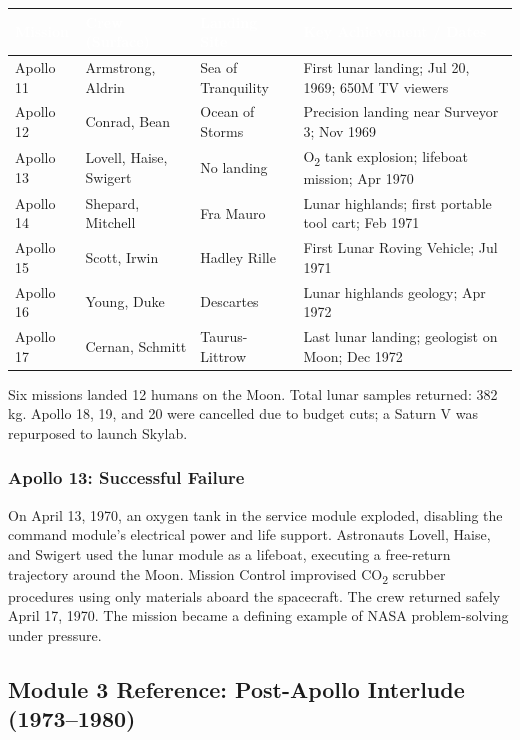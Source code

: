 \documentclass[11pt,letterpaper]{article}
\newcommand{\tableheader}[1]{\textbf{\sffamily\textcolor{white}{#1}}}
\begin{document}
\begin{center}
\begin{tabularx}{\textwidth}{L{1.8cm}L{3.5cm}L{2.2cm}X}
\toprule
{}
\tableheader{Mission} & \tableheader{Crew (Surface)} & \tableheader{Landing Site} & \tableheader{Key Achievement / Dates} \\
\midrule
Apollo 11 & Armstrong, Aldrin & Sea of Tranquility & First lunar landing; Jul 20, 1969; 650M TV viewers \\
Apollo 12 & Conrad, Bean & Ocean of Storms & Precision landing near Surveyor 3; Nov 1969 \\
Apollo 13 & Lovell, Haise, Swigert & No landing & O\textsubscript{2} tank explosion; lifeboat mission; Apr 1970 \\
Apollo 14 & Shepard, Mitchell & Fra Mauro & Lunar highlands; first portable tool cart; Feb 1971 \\
Apollo 15 & Scott, Irwin & Hadley Rille & First Lunar Roving Vehicle; Jul 1971 \\
Apollo 16 & Young, Duke & Descartes & Lunar highlands geology; Apr 1972 \\
Apollo 17 & Cernan, Schmitt & Taurus-Littrow & Last lunar landing; geologist on Moon; Dec 1972 \\
\bottomrule
\end{tabularx}
\end{center}

Six missions landed 12 humans on the Moon. Total lunar samples returned: 382 kg. Apollo 18, 19, and 20 were cancelled due to budget cuts; a Saturn V was repurposed to launch Skylab.

\subsubsection{Apollo 13: Successful Failure}

On April 13, 1970, an oxygen tank in the service module exploded, disabling the command module's electrical power and life support. Astronauts Lovell, Haise, and Swigert used the lunar module as a lifeboat, executing a free-return trajectory around the Moon. Mission Control improvised CO\textsubscript{2} scrubber procedures using only materials aboard the spacecraft. The crew returned safely April 17, 1970. The mission became a defining example of NASA problem-solving under pressure.

\subsection{Module 3 Reference: Post-Apollo Interlude (1973--1980)}
\end{document}
